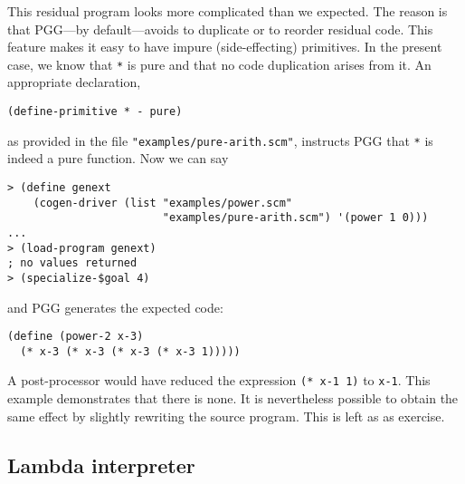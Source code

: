 \documentclass[11pt]{article}
\begin{document}
This residual program looks more complicated than we expected. The
reason is that PGG---by default---avoids to duplicate or to reorder
residual code. This feature makes it easy to have impure
(side-effecting) primitives. In the present case, we know that
\texttt{*} is pure and that no code duplication arises from it. 
An appropriate declaration,
\begin{small}
\begin{verbatim}
(define-primitive * - pure)
\end{verbatim}
\end{small}
as provided in the file \texttt{"examples/pure-arith.scm"}, instructs PGG that
\texttt{*} is indeed a pure function.
Now we can say
\begin{small}
\begin{verbatim}
> (define genext
    (cogen-driver (list "examples/power.scm"
                        "examples/pure-arith.scm") '(power 1 0)))
...
> (load-program genext)
; no values returned
> (specialize-$goal 4)
\end{verbatim}
\end{small}%
and PGG generates the expected code:
\begin{small}
\begin{verbatim}
(define (power-2 x-3)
  (* x-3 (* x-3 (* x-3 (* x-3 1)))))
\end{verbatim}
\end{small}
A post-processor would have reduced the expression \texttt{(* x-1 1)}
to \texttt{x-1}. This example demonstrates that there is none. It is
nevertheless possible to obtain the same effect by slightly rewriting
the source program. This is left as as exercise.


\subsection{Lambda interpreter}
\label{sec:lambda-interpreter}
\end{document}
